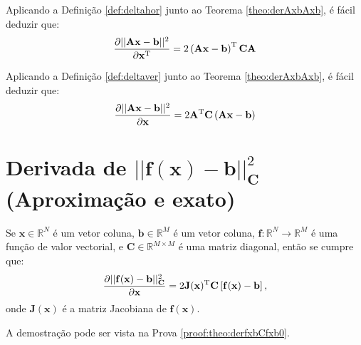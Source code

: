 \begin{corollaryT}\label{coro:derAxbAxb1}
Aplicando a Definição \ref{def:deltahor} junto ao Teorema \ref{theo:derAxbAxb}, é
fácil deduzir que:
\begin{equation}
\frac{\partial ||\mathbf{A}\mathbf{x}-\mathbf{b}||^2}{\partial \mathbf{x}^{\mathrm{T}}}=
2\left(\mathbf{A}\mathbf{x}- \mathbf{b} \right)^{\mathrm{T}}\mathbf{C}\mathbf{A}
\end{equation}
\end{corollaryT}

\begin{corollaryT}\label{coro:derAxbAxb2}
Aplicando a Definição \ref{def:deltaver} junto ao Teorema \ref{theo:derAxbAxb}, é
fácil deduzir que:
\begin{equation}
\frac{\partial ||\mathbf{A}\mathbf{x}-\mathbf{b}||^2}{\partial \mathbf{x} }=
2 \mathbf{A}^{\mathrm{T}}\mathbf{C}\left(\mathbf{A}\mathbf{x}-\mathbf{b}\right)
\end{equation}
\end{corollaryT}

\section{Derivada de $||\mathbf{f}(\mathbf{x})-\mathbf{b}||_{\mathbf{C}}^2$  
(Aproximação e exato)
}

\begin{theorem}\label{theo:derfxbCfxb0}
Se 
$\mathbf{x}\in \mathbb{R}^N$ é um vetor coluna, 
$\mathbf{b}\in \mathbb{R}^M$ é um vetor coluna,  
$\mathbf{f}: \mathbb{R}^{N}\rightarrow \mathbb{R}^{M}$ é uma função de valor vectorial, e
$\mathbf{C} \in \mathbb{R}^{M\times M}$ é uma matriz diagonal, 
então se cumpre que:
\begin{equation}
\frac{\partial ||\mathbf{f}(\mathbf{x})-\mathbf{b}||_{\mathbf{C}}^2}{\partial \mathbf{x}} =
2 \mathbf{J}(\mathbf{x})^{\mathrm{T}}\mathbf{C}\left[\mathbf{f}(\mathbf{x})-\mathbf{b}\right],
\end{equation}
onde $\mathbf{J}(\mathbf{x})$ é a matriz Jacobiana de $\mathbf{f}(\mathbf{x})$.

A demostração pode ser vista na Prova \ref{proof:theo:derfxbCfxb0}.
\end{theorem}


